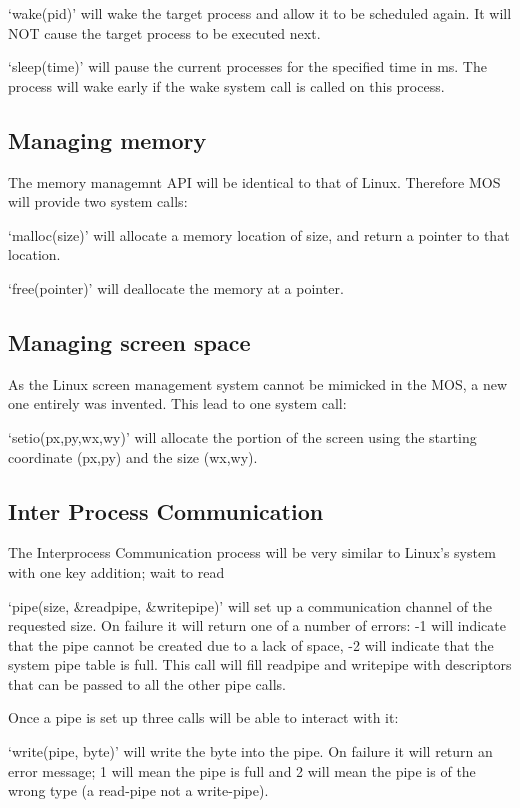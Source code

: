\documentclass[a4paper]{report}
\begin{document}
`wake(pid)' will wake the target process and allow it to be scheduled again. It will NOT cause the target process to be executed next.

`sleep(time)' will pause the current processes for the specified time in ms. The process will wake early if the wake system call is called on this process.

\subsection{Managing memory}

The memory managemnt API will be identical to that of Linux. Therefore MOS will provide two system calls:

`malloc(size)' will allocate a memory location of size, and return a pointer to that location.

`free(pointer)' will deallocate the memory at a pointer.

\subsection{Managing screen space}

As the Linux screen management system cannot be mimicked in the MOS, a new one entirely was invented. This lead to one system call:

`setio(px,py,wx,wy)' will allocate the portion of the screen using the starting coordinate (px,py) and the size (wx,wy).


\subsection{Inter Process Communication}

The Interprocess Communication process will be very similar to Linux's system with one key addition; wait to read

`pipe(size, \&readpipe, \&writepipe)' will set up a communication channel of the requested size. On failure it will return one of a number of errors: -1 will indicate that the pipe cannot be created due to a lack of space, -2 will indicate that the system pipe table is full. This call will fill readpipe and writepipe with descriptors that can be passed to all the other pipe calls.

Once a pipe is set up three calls will be able to interact with it:

`write(pipe, byte)' will write the byte into the pipe. On failure it will return an error message; 1 will mean the pipe is full and 2 will mean the pipe is of the wrong type (a read-pipe not a write-pipe).
\end{document}
